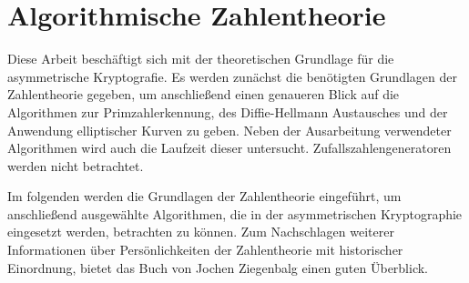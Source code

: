\chapter*{Algorithmische Zahlentheorie}\label{Algorithmische Zahlentheorie}
		Diese Arbeit beschäftigt sich mit der theoretischen Grundlage für die asymmetrische Kryptografie. Es werden zunächst die benötigten Grundlagen der Zahlentheorie gegeben, um anschließend einen genaueren Blick auf die Algorithmen zur Primzahlerkennung, des Diffie-Hellmann Austausches und der Anwendung elliptischer Kurven zu geben. Neben der Ausarbeitung verwendeter Algorithmen wird auch die Laufzeit dieser untersucht. Zufallszahlengeneratoren werden nicht betrachtet.
		
		\wupp Im folgenden werden die Grundlagen der Zahlentheorie eingeführt, um anschließend ausgewählte Algorithmen, die in der asymmetrischen Kryptographie eingesetzt werden, betrachten zu können. Zum Nachschlagen weiterer Informationen über Persönlichkeiten der Zahlentheorie mit historischer Einordnung, bietet das Buch \cite{Elementare:Zahlentheorie} von Jochen Ziegenbalg einen guten Überblick.